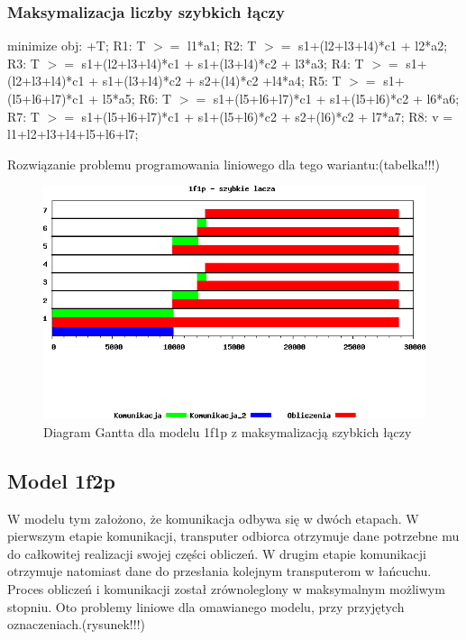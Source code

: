 \documentclass[a4paper,11pt, titlepage]{article}
\begin{document}
\subsubsection{Maksymalizacja liczby szybkich łączy}
\begin{flushleft}

minimize obj: +T;\linebreak
\linebreak
R1: T $>=$ l1*a1;\linebreak
R2: T $>=$ s1+(l2+l3+l4)*c1 + l2*a2;\linebreak
R3: T $>=$ s1+(l2+l3+l4)*c1 + s1+(l3+l4)*c2 + l3*a3;\linebreak
R4: T $>=$ s1+(l2+l3+l4)*c1 + s1+(l3+l4)*c2 + s2+(l4)*c2 +l4*a4;\linebreak
R5: T $>=$ s1+(l5+l6+l7)*c1 + l5*a5;\linebreak
R6: T $>=$ s1+(l5+l6+l7)*c1 + s1+(l5+l6)*c2 + l6*a6;\linebreak
R7: T $>=$ s1+(l5+l6+l7)*c1 + s1+(l5+l6)*c2 +  s2+(l6)*c2 + l7*a7;\linebreak
R8: v = l1+l2+l3+l4+l5+l6+l7;\linebreak
\end{flushleft}

Rozwiązanie problemu programowania liniowego dla tego wariantu:(tabelka!!!)
\begin{figure}[htp!]
\includegraphics[width=1.0\textwidth]{wykresy/1p1f_lacza}
\caption{Diagram Gantta dla modelu 1f1p z maksymalizacją szybkich łączy \label{1p1f_l}}
\end{figure}
\subsection{Model 1f2p}
W modelu tym założono, że komunikacja odbywa się w dwóch etapach. W pierwszym etapie komunikacji, transputer odbiorca otrzymuje dane potrzebne mu do całkowitej realizacji swojej części obliczeń. W drugim etapie komunikacji otrzymuje natomiast dane do przesłania kolejnym transputerom w łańcuchu. Proces obliczeń i komunikacji został zrównoleglony w maksymalnym możliwym stopniu. Oto problemy liniowe dla omawianego modelu, przy przyjętych oznaczeniach.(rysunek!!!)
\end{document}
